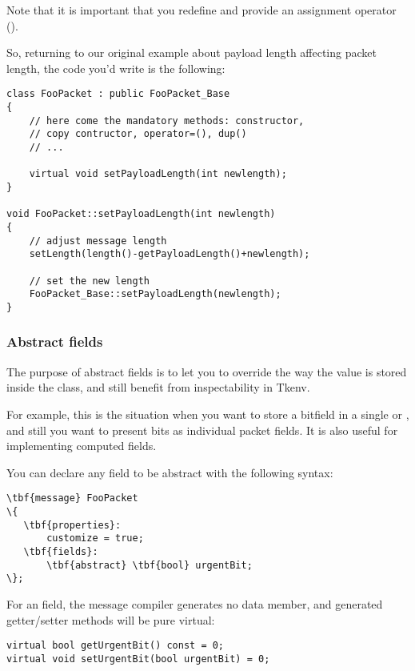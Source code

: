 Note that it is important that you redefine  and
provide an assignment operator ().

So, returning to our original example about payload length
affecting packet length, the code you'd write is the following:

\begin{verbatim}
class FooPacket : public FooPacket_Base
{
    // here come the mandatory methods: constructor,
    // copy contructor, operator=(), dup()
    // ...

    virtual void setPayloadLength(int newlength);
}

void FooPacket::setPayloadLength(int newlength)
{
    // adjust message length
    setLength(length()-getPayloadLength()+newlength);

    // set the new length
    FooPacket_Base::setPayloadLength(newlength);
}
\end{verbatim}



\subsubsection{Abstract fields}

The purpose of abstract fields is to let you to override
the way the value is stored inside the class,
and still benefit from inspectability in Tkenv.

For example, this is the situation when you want to store a bitfield
in a single  or , and still you want
to present bits as individual packet fields.
It is also useful for implementing computed fields.

You can declare any field to be abstract with the following syntax:

\begin{Verbatim}[commandchars=\\\{\}]
\tbf{message} FooPacket
\{
   \tbf{properties}:
       customize = true;
   \tbf{fields}:
       \tbf{abstract} \tbf{bool} urgentBit;
\};
\end{Verbatim}

For an  field, the message compiler generates
no data member, and generated getter/setter methods will be pure
virtual:

\begin{verbatim}
virtual bool getUrgentBit() const = 0;
virtual void setUrgentBit(bool urgentBit) = 0;
\end{verbatim}


